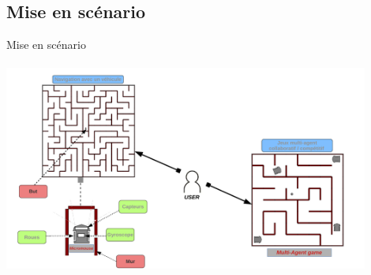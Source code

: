 \documentclass{beamer}
\begin{document}
\subsection{Mise en scénario}
\begin{frame}{Mise en scénario}

\begin{center}
    
\includegraphics[width=12cm,height=7cm,keepaspectratio]{pics/mise_en_scenario.pdf}

\end{center}
\end{frame}



\end{document}
